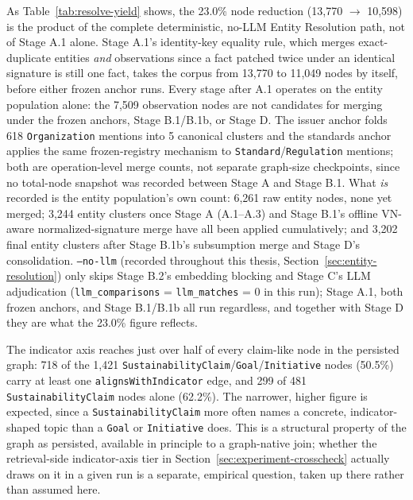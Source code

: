 \documentclass[fontsize=12pt,oneside,headings=small]{scrreprt}
\begin{document}
As Table~\ref{tab:resolve-yield} shows, the 23.0\% node reduction (13,770 $\to$ 10,598) is the product of the complete deterministic, no-LLM Entity Resolution path, not of Stage A.1 alone. Stage A.1's identity-key equality rule, which merges exact-duplicate entities \emph{and} observations since a fact patched twice under an identical signature is still one fact, takes the corpus from 13,770 to 11,049 nodes by itself, before either frozen anchor runs. Every stage after A.1 operates on the entity population alone: the 7,509 observation nodes are not candidates for merging under the frozen anchors, Stage B.1/B.1b, or Stage D. The issuer anchor folds 618 \texttt{Organization} mentions into 5 canonical clusters and the standards anchor applies the same frozen-registry mechanism to \texttt{Standard}/\texttt{Regulation} mentions; both are operation-level merge counts, not separate graph-size checkpoints, since no total-node snapshot was recorded between Stage A and Stage B.1. What \emph{is} recorded is the entity population's own count: 6,261 raw entity nodes, none yet merged; 3,244 entity clusters once Stage A (A.1--A.3) and Stage B.1's offline VN-aware normalized-signature merge have all been applied cumulatively; and 3,202 final entity clusters after Stage B.1b's subsumption merge and Stage D's consolidation. \texttt{--no-llm} (recorded throughout this thesis, Section~\ref{sec:entity-resolution}) only skips Stage B.2's embedding blocking and Stage C's LLM adjudication (\texttt{llm\_comparisons} = \texttt{llm\_matches} = 0 in this run); Stage A.1, both frozen anchors, and Stage B.1/B.1b all run regardless, and together with Stage D they are what the 23.0\% figure reflects.

The indicator axis reaches just over half of every claim-like node in the persisted graph: 718 of the 1,421 \texttt{SustainabilityClaim}/\texttt{Goal}/\texttt{Initiative} nodes (50.5\%) carry at least one \texttt{alignsWithIndicator} edge, and 299 of 481 \texttt{SustainabilityClaim} nodes alone (62.2\%). The narrower, higher figure is expected, since a \texttt{SustainabilityClaim} more often names a concrete, indicator-shaped topic than a \texttt{Goal} or \texttt{Initiative} does. This is a structural property of the graph as persisted, available in principle to a graph-native join; whether the retrieval-side indicator-axis tier in Section~\ref{sec:experiment-crosscheck} actually draws on it in a given run is a separate, empirical question, taken up there rather than assumed here.
\end{document}
